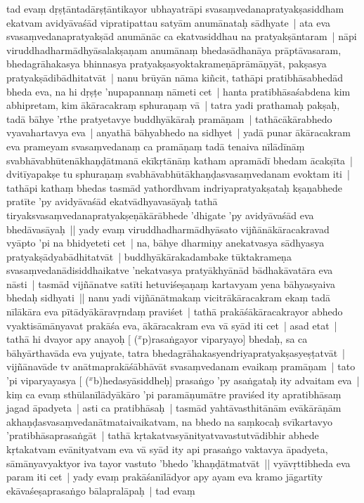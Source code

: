 \documentclass[article,a4paper]{memoir}
\newcommand{\corr}[1]{($^{x}$#1)}
\begin{document}
	  \pstart tad evaṃ dṛṣṭā\-ntadā\-rṣṭā\-ntikayor ubhayatrā\-pi svasaṃvedanapratyakṣasiddham ekatvam avidyā\-vaśā\-d vipratipattau satyā\-m anumā\-nataḥ sā\-dhyate | ata eva svasaṃvedanapratyakṣā\-d anumā\-nā\-c ca ekatvasiddhau na pratyakṣā\-ntaram | nā\-pi viruddhadharmā\-dhyā\-salakṣaṇam anumā\-naṃ bhedasā\-dhanā\-ya prā\-ptā\-vasaram, bhedagrā\-hakasya bhinnasya pratyakṣasyoktakrameṇā\-prā\-mā\-ṇyā\-t, pakṣasya pratyakṣā\-dibā\-dhitatvā\-t | \label{thakur75-143.6} nanu brū\-yā\-n nā\-ma kiñcit, tathā\-pi pratibhā\-sabhedā\-d bheda eva, na hi dṛṣṭe 'nupapannaṃ nā\-meti cet | hanta pratibhā\-saśabdena kim abhipretam, kim ā\-kā\-racakraṃ sphuraṇaṃ vā\- | tatra yadi prathamaḥ pakṣaḥ, tadā\- bā\-hye 'rthe pratyetavye buddhyā\-kā\-raḥ pramā\-ṇam | tathā\-cā\-kā\-rabhedo vyavahartavya eva | anyathā\- bā\-hyabhedo na sidhyet | yadā\- punar ā\-kā\-racakram eva prameyam svasaṃvedanaṃ ca pramā\-ṇaṃ tadā\- tenaiva nī\-lā\-dī\-nā\-ṃ svabhā\-vabhū\-tenā\-khaṇḍā\-tmanā\- ekī\-kṛtā\-nā\-ṃ katham apramā\-dī\- bhedam ā\-cakṣī\-ta | \label{thakur75-143.12} dvitī\-yapakṣe tu sphuraṇaṃ svabhā\-vabhū\-tā\-khaṇḍasvasaṃvedanam evoktam iti | tathā\-pi kathaṃ bhedas tasmā\-d yathordhvam indriyapratyakṣataḥ kṣaṇabhede pratī\-te 'py avidyā\-vaśā\-d ekatvā\-dhyavasā\-yaḥ tathā\- tiryaksvasaṃvedanapratyakṣeṇā\-kā\-rā\-bhede 'dhigate 'py avidyā\-vaśā\-d eva bhedā\-vasā\-yaḥ || \label{thakur75-143.15} yady evaṃ viruddhadharmā\-dhyā\-sato vijñā\-nā\-kā\-racakravad vyā\-pto 'pi na bhidyeteti cet | na, bā\-hye dharmiṇy anekatvasya sā\-dhyasya pratyakṣā\-dyabā\-dhitatvā\-t | buddhyā\-kā\-rakadambake tū\-ktakrameṇa svasaṃvedanā\-disiddhaikatve 'nekatvasya pratyā\-khyā\-nā\-d bā\-dhakā\-vatā\-ra eva nā\-sti | tasmā\-d vijñā\-natve satī\-ti hetuviśeṣaṇaṃ kartavyam yena bā\-hyasyaiva bhedaḥ sidhyati || \label{thakur75-143.20} nanu yadi vijñā\-nā\-tmakaṃ vicitrā\-kā\-racakram ekaṃ tadā\- nī\-lā\-kā\-ra eva pī\-tā\-dyā\-kā\-ravṛndaṃ praviśet | tathā\- prakā\-śā\-kā\-racakrayor abhedo vyaktisā\-mā\-nyavat prakā\-śa eva, ā\-kā\-racakram eva vā\- syā\-d iti cet | asad etat | tathā\- hi dvayor apy anayoḥ [ {\corr prasaṅgayor viparyayo}] bhedaḥ, sa ca bā\-hyā\-rthavā\-da eva yujyate, tatra bhedagrā\-hakasyendriyapratyakṣasyeṣṭatvā\-t | vijñā\-navā\-de tv anā\-tmaprakā\-śā\-bhā\-vā\-t svasaṃvedanam evaikaṃ pramā\-ṇam | tato 'pi viparyayasya [ {\corr bhedasyā\-siddheḥ}] prasaṅgo 'py asaṅgataḥ ity advaitam eva | \label{thakur75-143.26} kiṃ ca evaṃ sthū\-lanī\-lā\-dyā\-kā\-ro 'pi paramā\-ṇumā\-tre praviśed ity apratibhā\-saṃ jagad ā\-padyeta | asti ca pratibhā\-saḥ | tasmā\-d yahtā\-vasthitā\-nā\-m evā\-kā\-rā\-ṇā\-m akhaṇḍasvasaṃvedanā\-tmataivaikatvam, na bhedo na saṃkocaḥ svī\-kartavyo 'pratibhā\-saprasaṅgā\-t | tathā\- kṛtakatvasyā\-nityatvavastutvā\-dibhir abhede kṛtakatvam evā\-nityatvam eva vā\- syā\-d ity api prasaṅgo vaktavya ā\-padyeta, sā\-mā\-nyavyaktyor iva tayor vastuto 'bhedo 'khaṇḍā\-tmatvā\-t || \label{thakur75-143.31} vyā\-vṛttibheda eva param iti cet | yady evaṃ prakā\-śanī\-lā\-dyor apy ayam eva kramo jā\-gartī\-ty ekā\-vaśeṣaprasaṅgo bā\-lapralā\-paḥ | tad evaṃ
	\pend
      
\end{document}
